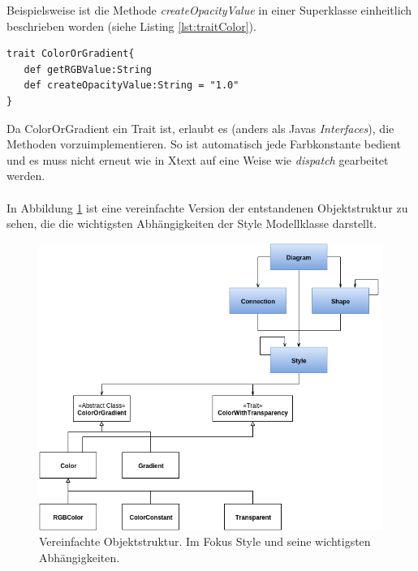 Beispielsweise ist die Methode \textit{createOpacityValue} in einer Superklasse einheitlich beschrieben worden (siehe Listing \ref{lst:traitColor}).\begin{lstlisting}[style=scala, caption = {Trait ColorOrGradient}, label = {lst:traitColor}]
trait ColorOrGradient{
   def getRGBValue:String
   def createOpacityValue:String = "1.0"
}
\end{lstlisting}Da ColorOrGradient ein Trait ist, erlaubt es (anders als Javas \textit{Interfaces}), die Methoden vorzuimplementieren. So ist automatisch jede Farbkonstante bedient und es muss nicht erneut wie in Xtext auf eine Weise wie \textit{dispatch} gearbeitet werden.\\\\In Abbildung \ref{objectstructureStyle} ist eine vereinfachte Version der entstandenen Objektstruktur zu sehen, die die wichtigsten Abhängigkeiten der Style Modellklasse darstellt.
\begin{figure}[H]
\begin{center}
\includegraphics[width=\textwidth]{Bilder/styleObjektstruktur.png}
\caption{Vereinfachte Objektstruktur. Im Fokus Style und seine wichtigsten Abhängigkeiten.}
\label{objectstructureStyle}
\end{center}
\end{figure}
